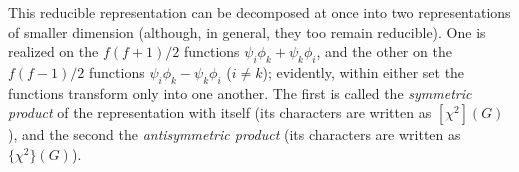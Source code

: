 This reducible representation can be decomposed at once into two representations of smaller dimension (although, in general, they too remain reducible).  One is realized on the $f(f+1)/2$ functions $\psi_i\phi_k+\psi_k\phi_i$, and the other on the $f(f-1)/2$ functions $\psi_i\phi_k-\psi_k\phi_i$ ($i\ne k$); evidently, within either set the functions transform only into one another.  The first is called the \emph{symmetric product} of the representation with itself (its characters are written as $[\chi^2](G)$), and the second the \emph{antisymmetric product} (its characters are written as $\{\chi^2\}(G)$).

